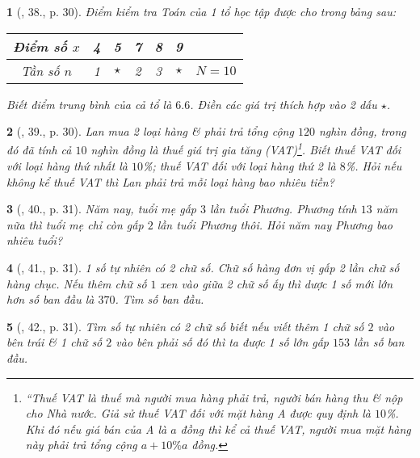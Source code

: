 \documentclass{article}
\newtheorem{baitoan}{}
\begin{document}
\begin{baitoan}[\cite{SGK_Toan_8_tap_2}, 38., p. 30]
	Điểm kiểm tra Toán của 1 tổ học tập được cho trong bảng sau:
	\begin{table}[H]
		\centering
		\begin{tabular}{|c|c|c|c|c|c|c|}
			\hline
			Điểm số $x$ & 4 & 5 & 7 & 8 & 9 &  \\
			\hline
			Tần số $n$ & 1 & $\star$ & 2 & 3 & $\star$ & $N = 10$ \\
			\hline
		\end{tabular}
	\end{table}
	Biết điểm trung bình của cả tổ là $6.6$. Điền các giá trị thích hợp vào 2 dấu $\star$.
\end{baitoan}

\begin{baitoan}[\cite{SGK_Toan_8_tap_2}, 39., p. 30]
	Lan mua 2 loại hàng \& phải trả tổng cộng $120$ nghìn đồng, trong đó đã tính cả $10$ nghìn đồng là thuế giá trị gia tăng (VAT)\footnote{``Thuế VAT là thuế mà người mua hàng phải trả, người bán hàng thu \& nộp cho Nhà nước. Giả sử thuế VAT đối với mặt hàng A được quy định là $10$\%. Khi đó nếu giá bán của A là $a$ đồng thì kể cả thuế VAT, người mua mặt hàng này phải trả tổng cộng $a + 10\%a$ đồng.}. Biết thuế VAT đối với loại hàng thứ nhất là $10$\%; thuế VAT đối với loại hàng thứ 2 là $8$\%. Hỏi nếu không kể thuế VAT thì Lan phải trả mỗi loại hàng bao nhiêu tiền?
\end{baitoan}

\begin{baitoan}[\cite{SGK_Toan_8_tap_2}, 40., p. 31]
	Năm nay, tuổi mẹ gấp $3$ lần tuổi Phương. Phương tính $13$ năm nữa thì tuổi mẹ chỉ còn gấp $2$ lần tuổi Phương thôi. Hỏi năm nay Phương bao nhiêu tuổi?
\end{baitoan}

\begin{baitoan}[\cite{SGK_Toan_8_tap_2}, 41., p. 31]
	1 số tự nhiên có 2 chữ số. Chữ số hàng đơn vị gấp 2 lần chữ số hàng chục. Nếu thêm chữ số $1$ xen vào giữa 2 chữ số ấy thì dược 1 số mới lớn hơn số ban đầu là $370$. Tìm số ban đầu.
\end{baitoan}

\begin{baitoan}[\cite{SGK_Toan_8_tap_2}, 42., p. 31]
	Tìm số tự nhiên có 2 chữ số biết nếu viết thêm 1 chữ số $2$ vào bên trái \& 1 chữ số $2$ vào bên phải số đó thì ta được 1 số lớn gấp $153$ lần số ban đầu.
\end{baitoan}
\end{document}
